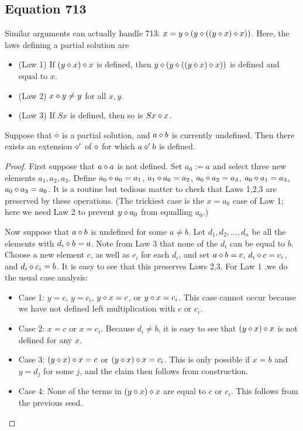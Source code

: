 \subsection{Equation 713}

Similar arguments can actually handle 713: $x = y \diamond (y \diamond ((y \diamond x) \diamond x))$. Here, the laws defining a partial solution are
\begin{itemize}
\item (Law 1) If $(y \diamond x) \diamond x$ is defined, then $y \diamond (y \diamond ((y \diamond x) \diamond x))$ is defined and equal to $x$.
\item (Law 2) $x \diamond y \neq y$ for all $x,y$.
\item (Law 3) If $Sx$ is defined, then so is $Sx \diamond x$.
\end{itemize}

\begin{lemma}[713 extension]\label{713-extension}  Suppose that $\diamond$ is a partial solution, and $a \diamond b$ is currently undefined.  Then there exists an extension $\diamond'$ of $\diamond$ for which $a \diamond' b$ is defined.
\end{lemma}

\begin{proof}  First suppose that $a \diamond a$ is not defined.  Set $a_0 := a$ and select three new elements $a_1,a_2,a_3$.  Define $a_0 \diamond a_0 = a_1$, $a_1 \diamond a_0 = a_2$, $a_0 \diamond a_2 = a_3$, $a_0 \diamond a_1 = a_3$, $a_0 \diamond a_3 = a_0$.  It is a routine but tedious matter to check that Laws 1,2,3 are preserved by these operations.  (The trickiest case is the $x=a_0$ case of Law 1; here we need Law 2 to prevent $y \diamond a_0$ from equalling $a_0$.)

Now suppose that $a \diamond b$ is undefined for some $a \neq b$.  Let $d_1,d_2,\dots,d_n$ be all the elements with $d_i \diamond b = a$.  Note from Law 3 that none of the $d_i$ can be equal to $b$.  Choose a new element $c$, as well as $c_i$ for each $d_i$, and set $a \diamond b = c$, $d_i \diamond c = c_i$, and $d_i \diamond c_i = b$.  It is easy to see that this preserves Laws 2,3.  For Law 1 ,we do the usual case analysis:
\begin{itemize}
\item Case 1: $y = c$, $y = c_i$, $y \diamond x = c$, or $y \diamond x = c_i$.  This case cannot occur because we have not defined left multiplication with $c$ or $c_i$.
\item Case 2: $x = c$ or $x = c_i$.  Because $d_i \neq b$, it is easy to see that $(y \diamond x) \diamond x$ is not defined for any $x$.
\item Case 3: $(y \diamond x) \diamond x = c$ or $(y \diamond x) \diamond x = c_i$.  This is only possible if $x=b$ and $y = d_j$ for some $j$, and the claim then follows from construction.
\item Case 4: None of the terms in $(y \diamond x) \diamond x$ are equal to $c$ or $c_i$.  This follows from the previous seed.
\end{itemize}
\end{proof}

